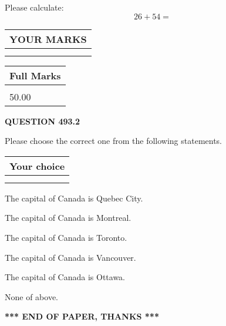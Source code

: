 \documentclass[12pt]{article}
\begin{document}
  
 
Please calculate:
\begin{equation}
26 +  %
54 = \nonumber
\end{equation}
 

 

 
  
\vspace{0.2in}
  
\noindent\begin{tabular}{|l|}
\hline
 YOUR MARKS  \\
\hline
 \\ 
 \\ 
\hline
\end{tabular}
\hspace{0.05in} \begin{tabular}{|l|}
\hline
 Full Marks  \\
\hline
 \\ 
50.00 \\
\hline
\end{tabular}
{\textbf{\Large{QUESTION
493.2 
}}}
  
  
Please choose the correct one from the following statements.
  
  
\noindent\hspace{3.0in} \begin{tabular}{|l|}
\hline
Your choice \\
\hline
 \\ 
 \\ 
\hline
\end{tabular}
  
  
 
 
The capital of Canada is Quebec City.
 
 
The capital of Canada is Montreal.
 
 
The capital of Canada is Toronto.
 
 
The capital of Canada is Vancouver.
 
 
The capital of Canada is Ottawa.
 
 
 None of above.
 
 
   
   
 \vspace{0.2in}
 
   
   
   
   
\vspace{1.0in} 
{\textbf{\large{ *** END OF PAPER, THANKS *** }}} 
   
\end{document}
